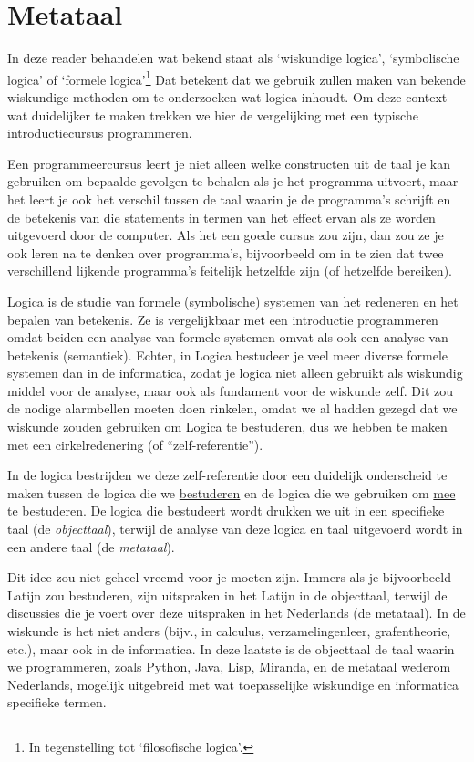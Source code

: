 \section{Metataal}\label{sec:metataal}
In deze reader behandelen wat bekend staat als `wiskundige logica', `symbolische logica' of `formele logica'\footnote{In tegenstelling tot `filosofische logica'.} Dat betekent dat we gebruik zullen maken van bekende wiskundige methoden om te onderzoeken wat logica inhoudt. Om deze context wat duidelijker te maken trekken we hier de vergelijking met een typische introductiecursus programmeren.

Een programmeercursus leert je niet alleen welke constructen uit de taal je kan gebruiken om bepaalde gevolgen te behalen als je het programma uitvoert, maar het leert je ook het verschil tussen de taal waarin je de programma's schrijft en de betekenis van die statements in termen van het effect ervan als ze worden uitgevoerd door de computer.
Als het een goede cursus zou zijn, dan zou ze je ook leren na te denken over programma's, bijvoorbeeld om in te zien dat twee verschillend lijkende programma's feitelijk hetzelfde zijn (of hetzelfde bereiken).

Logica is de studie van formele (symbolische) systemen van het redeneren en het bepalen van betekenis. Ze is vergelijkbaar met een introductie programmeren omdat beiden een analyse van formele systemen omvat als ook een analyse van betekenis (semantiek). Echter, in Logica bestudeer je veel meer diverse formele systemen dan in de informatica, zodat je logica niet alleen gebruikt als wiskundig middel voor de analyse, maar ook als fundament voor de wiskunde zelf. Dit zou de nodige alarmbellen moeten doen rinkelen, omdat we al hadden gezegd dat we wiskunde zouden gebruiken om Logica te bestuderen, dus we hebben te maken met een cirkelredenering (of \enquote{zelf-referentie}).

In de logica bestrijden we deze zelf-referentie door een duidelijk onderscheid te maken tussen de logica die we \underline{bestuderen} en de logica die we gebruiken om \underline{mee} te bestuderen. De logica die bestudeert wordt drukken we uit in een specifieke taal (de \emph{objecttaal}), terwijl de analyse van deze logica en taal uitgevoerd wordt in een andere taal (de \emph{metataal}).

Dit idee zou niet geheel vreemd voor je moeten zijn. Immers als je bijvoorbeeld Latijn zou bestuderen, zijn uitspraken in het Latijn in de objecttaal, terwijl de discussies die je voert over deze uitspraken in het Nederlands (de metataal). In de wiskunde is het niet anders (bijv., in calculus, verzamelingenleer, grafentheorie, etc.), maar ook in de informatica. In deze laatste is de objecttaal de taal waarin we programmeren, zoals Python, Java, Lisp, Miranda, en de metataal wederom Nederlands, mogelijk uitgebreid met wat toepasselijke wiskundige en informatica specifieke termen.

